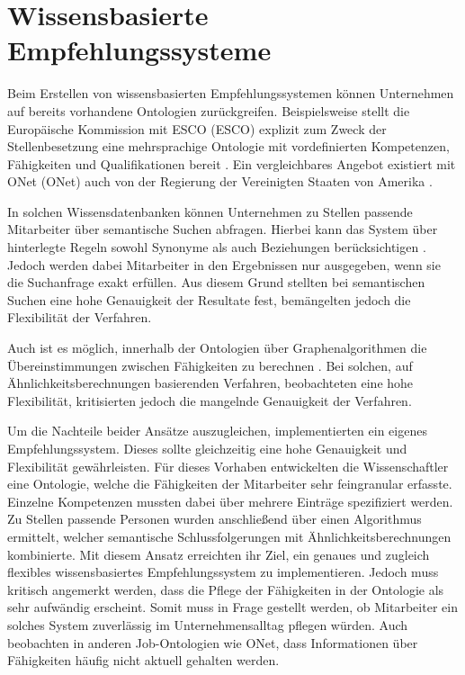 \section{Wissensbasierte Empfehlungssysteme}
\label{ch:empfehlungssysteme:wissensbasierteAnsaetze}
Beim Erstellen von wissensbasierten Empfehlungssystemen können Unternehmen auf bereits vorhandene Ontologien zurückgreifen. Beispielsweise stellt die Europäische Kommission mit \acs{ESCO} (\acl{ESCO}) explizit zum Zweck der Stellenbesetzung eine mehrsprachige Ontologie mit vordefinierten Kompetenzen, Fähigkeiten und Qualifikationen bereit \cite[S. 1ff.]{leVrang:2014}. Ein vergleichbares Angebot existiert mit \acs{ONet} (\acl{ONet}) auch von der Regierung der Vereinigten Staaten von Amerika \cite[S. 2]{aCombinedRepresentation:2018}.

In solchen Wissensdatenbanken können Unternehmen zu Stellen passende Mitarbeiter über semantische Suchen abfragen. Hierbei kann das System über hinterlegte Regeln sowohl Synonyme als auch Beziehungen berücksichtigen \cite[S. 2f.]{singto:2013}. Jedoch werden dabei Mitarbeiter in den Ergebnissen nur ausgegeben, wenn sie die Suchanfrage exakt erfüllen. Aus diesem Grund stellten \textcite[S. 3]{bianchini:2008} bei semantischen Suchen eine hohe Genauigkeit der Resultate fest, bemängelten jedoch die Flexibilität der Verfahren.

Auch ist es möglich, innerhalb der Ontologien über Graphenalgorithmen die Übereinstimmungen zwischen Fähigkeiten zu berechnen \cite[S. 1f.]{balachander:2018}. Bei solchen, auf Ähnlichkeitsberechnungen basierenden Verfahren, beobachteten \textcite[S. 4]{bianchini:2008} eine hohe Flexibilität, kritisierten jedoch die mangelnde Genauigkeit der Verfahren.

Um die Nachteile beider Ansätze auszugleichen, implementierten \textcite[S. 4ff.]{semanticMatchmaking:2009} ein eigenes Empfehlungssystem. Dieses sollte gleichzeitig eine hohe Genauigkeit und Flexibilität gewährleisten. Für dieses Vorhaben entwickelten die Wissenschaftler eine Ontologie, welche die Fähigkeiten der Mitarbeiter sehr feingranular erfasste. Einzelne Kompetenzen mussten dabei über mehrere Einträge spezifiziert werden. Zu Stellen passende Personen wurden anschließend über einen Algorithmus ermittelt, welcher semantische Schlussfolgerungen mit Ähnlichkeitsberechnungen kombinierte. Mit diesem Ansatz erreichten \textcite[S. 11f.]{semanticMatchmaking:2009} ihr Ziel, ein genaues und zugleich flexibles wissensbasiertes Empfehlungssystem zu implementieren. Jedoch muss kritisch angemerkt werden, dass die Pflege der Fähigkeiten in der Ontologie als sehr aufwändig erscheint. Somit muss in Frage gestellt werden, ob Mitarbeiter ein solches System zuverlässig im Unternehmensalltag pflegen würden. Auch \textcite[S. 2]{aCombinedRepresentation:2018} beobachten in anderen Job-Ontologien wie \acs{ONet}, dass Informationen über Fähigkeiten häufig nicht aktuell gehalten werden.

